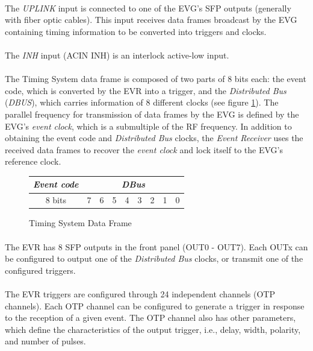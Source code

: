 \documentclass[openany]{article}
\begin{document}
		\paragraph{} The \emph{UPLINK} input is connected to one of the EVG's SFP outputs (generally with fiber optic cables). This input receives data frames broadcast by the EVG containing timing information to be converted into triggers and clocks.
		\paragraph{} The \emph{INH} input (ACIN INH) is an interlock active-low input.
		\paragraph{} The Timing System data frame is composed of two parts of 8 bits each: the event code, which is converted by the EVR into a trigger, and the \emph{Distributed Bus} (\emph{DBUS}), which carries information of 8 different clocks (see figure \ref{fig:data-frame-evr}). The parallel frequency for transmission of data frames by the EVG is defined by the EVG's \emph{event clock}, which is a submultiple of the RF frequency. In addition to obtaining the event code and \emph{Distributed Bus} clocks, the \emph{Event Receiver} uses the received data frames to recover the \emph{event clock} and lock itself to the EVG's reference clock.

		\begin{figure}[!h]
		\begin{tabular}{|cccccccc|c|c|c|c|c|c|c|c|}
		\hline
		\multicolumn{8}{|c|}{\emph{Event code}} & \multicolumn{8}{c|}{\emph{DBus}} \\ \hline
		\multicolumn{8}{|c|}{8 bits} & 7 & 6 & 5 & 4 & 3 & 2 & 1 & 0 \\ \hline
		\end{tabular}
		\centering
		\caption{Timing System Data Frame}
		\label{fig:data-frame-evr}
		\end{figure}
\FloatBarrier


		\paragraph{} The EVR has 8 SFP outputs in the front panel (OUT0 - OUT7). Each OUTx can be configured to output one of the \emph{Distributed Bus} clocks, or transmit one of the configured triggers.
		\paragraph{} The EVR triggers are configured through 24 independent channels (OTP channels). Each OTP channel can be configured to generate a trigger in response to the reception of a given event. The OTP channel also has other parameters, which define the characteristics of the output trigger, i.e., delay, width, polarity, and number of pulses.
\end{document}
